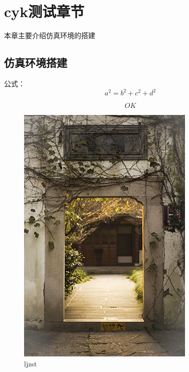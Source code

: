 \chapter{cyk测试章节}

本章主要介绍仿真环境的搭建

\section{仿真环境搭建}

公式：
\begin{equation}
	a^2=b^2+c^2+d^2
\end{equation}


\begin{equation}
	OK
\end{equation}

\begin{figure}[htb]
	\centering 
	\includegraphics[scale=1.0]{./Pictures/test.jpg} 
	\caption{ljzst} 
\end{figure}

